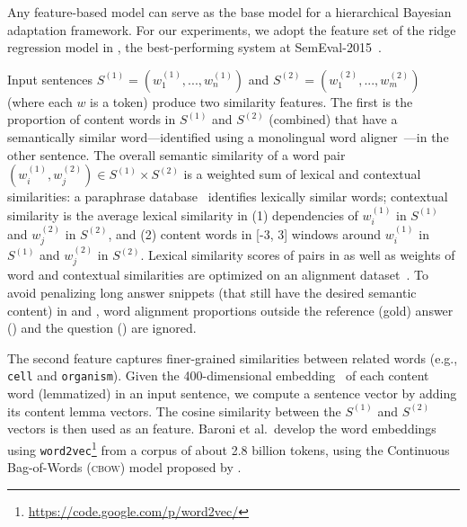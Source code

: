






Any feature-based \sts{} model can serve as the base model for
a hierarchical Bayesian adaptation framework. For our experiments, we adopt the
feature set of the ridge regression model in , the
best-performing system at SemEval-2015~\cite{Agirre:2015}.



Input sentences $S^{(1)}=(w^{(1)}_1, ..., w^{(1)}_n)$ and
$S^{(2)}=(w^{(2)}_1, ..., w^{(2)}_m)$ (where each $w$ is a token)
produce two similarity features.  The first is the proportion of
content words in $S^{(1)}$ and $S^{(2)}$ (combined) that have a
semantically similar word---identified using a monolingual word
aligner~\cite{Sultan:2014}---in the other sentence.  The overall
semantic similarity of a word pair $(w^{(1)}_i, w^{(2)}_j)
\in S^{(1)} \times S^{(2)}$ is a weighted sum
of lexical and contextual similarities: a paraphrase
database~\cite[]{Ganitkevitch:2013} identifies lexically
similar words; contextual similarity is the average lexical similarity
in (1) dependencies of $w^{(1)}_i$ in $S^{(1)}$ and $w^{(2)}_j$ in
$S^{(2)}$, and (2) content words in [-3, 3] windows around $w^{(1)}_i$ in
$S^{(1)}$ and $w^{(2)}_j$ in $S^{(2)}$.  Lexical similarity scores of
pairs in  as well as weights of word and contextual
similarities are optimized on an alignment
dataset~\cite{Brockett:2007}.  To avoid penalizing long answer
snippets (that still have the desired semantic content) in \sas{} and
\asr{}, word alignment proportions outside the reference
(gold) answer (\sas{}) and the question (\asr{}) are ignored.


The second feature captures finer-grained similarities
between related words (e.g., \texttt{cell} and \texttt{organism}).
Given the 400-dimensional embedding~\cite{Baroni:2014} of each
content word (lemmatized) in an input sentence, we compute a sentence
vector by adding its content lemma vectors. The cosine similarity
between the $S^{(1)}$ and $S^{(2)}$ vectors is then used as an \sts{}
feature. Baroni et al.\ develop the word embeddings using
\texttt{word2vec}\footnote{\url{https://code.google.com/p/word2vec/}}
from a corpus of about 2.8 billion tokens, using the Continuous Bag-of-Words
(\textsc{cbow}) model proposed by .
